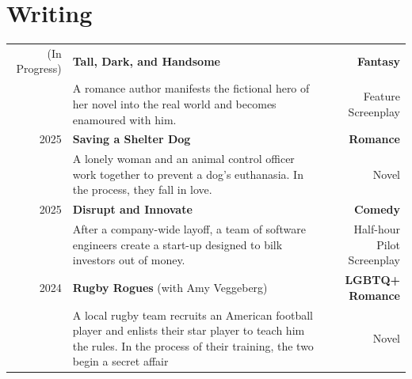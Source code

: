 \section*{Writing}
\begin{tabular}{r p{} r} (In Progress) & \textbf{Tall, Dark, and
    Handsome} & {\textbf{Fantasy}} \\
    & A romance author manifests the fictional hero of her novel into the real
    world and becomes enamoured with him. & Feature Screenplay\\
    2025 &\textbf{Saving a Shelter Dog}&{\textbf{Romance}}\\ &A lonely woman and
    an animal control officer work together to prevent a dog's euthanasia. In
    the process, they fall in love.&Novel\\
    2025    & {\textbf{Disrupt and Innovate}  } & \textbf{Comedy}\\ & After a
    company-wide layoff, a team of software engineers create a start-up designed
    to bilk investors out of money. & Half-hour Pilot Screenplay\\
    2024 & {\textbf{Rugby Rogues} (with Amy Veggeberg)} & {\textbf{LGBTQ+
    Romance}}\\ & A local rugby team recruits an American football player and
    enlists their star player to teach him the rules. In the process of their
    training, the two begin a secret affair & Novel
\end{tabular}